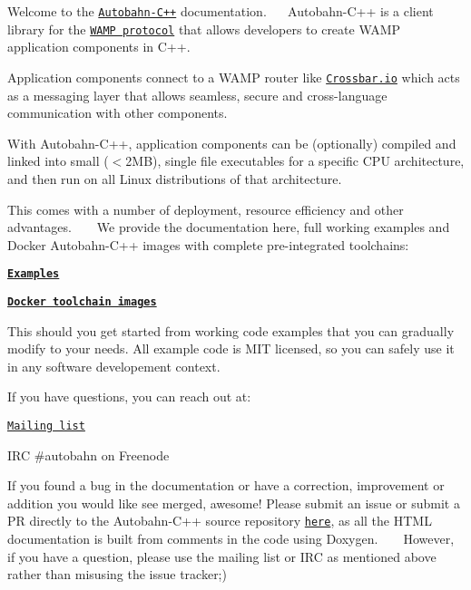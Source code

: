 Welcome to the \href{https://github.com/crossbario/autobahn-cpp}{\tt Autobahn-\/\+C++} documentation.~\newline
~\newline
 Autobahn-\/\+C++ is a client library for the \href{http://wamp-proto.org/}{\tt W\+A\+MP protocol} that allows developers to create W\+A\+MP application components in C++.

Application components connect to a W\+A\+MP router like \href{http://crossbar.io}{\tt Crossbar.\+io} which acts as a messaging layer that allows seamless, secure and cross-\/language communication with other components.

With Autobahn-\/\+C++, application components can be (optionally) compiled and linked into small ($<$2\+MB), single file executables for a specific C\+PU architecture, and then run on all Linux distributions of that architecture.

This comes with a number of deployment, resource efficiency and other advantages. ~\newline
~\newline
 We provide the documentation here, full working examples and Docker Autobahn-\/\+C++ images with complete pre-\/integrated toolchains\+:


\begin{DoxyItemize}
\item {\bfseries \href{https://github.com/crossbario/autobahn-cpp/tree/master/examples}{\tt Examples}}
\item {\bfseries \href{https://hub.docker.com/r/crossbario/autobahn-cpp/}{\tt Docker toolchain images}}
\end{DoxyItemize}

This should you get started from working code examples that you can gradually modify to your needs. All example code is M\+IT licensed, so you can safely use it in any software developement context.

If you have questions, you can reach out at\+:


\begin{DoxyItemize}
\item \href{https://groups.google.com/forum/#!forum/autobahnws}{\tt Mailing list}
\item I\+RC \#autobahn on Freenode
\end{DoxyItemize}

If you found a bug in the documentation or have a correction, improvement or addition you would like see merged, awesome! Please submit an issue or submit a PR directly to the Autobahn-\/\+C++ source repository \href{https://github.com/crossbario/autobahn-cpp}{\tt here}, as all the H\+T\+ML documentation is built from comments in the code using Doxygen. ~\newline
~\newline
 However, if you have a question, please use the mailing list or I\+RC as mentioned above rather than misusing the issue tracker;) 
